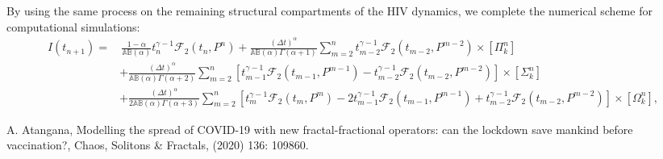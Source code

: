 \documentclass[10pt,a4paper]{amsart}
\numberwithin{equation}{section}
\begin{document}
By using the same process on the remaining structural compartments of the HIV dynamics, we complete the numerical scheme for computational simulations:
\begin{equation}
\begin{aligned}
I(t_{n+1}) = & \, \frac{1-\alpha}{\mathbb{AB}(\alpha)} t_n^{\gamma-1} \mathcal{F}_2(t_n, P^n) + \frac{(\Delta t)^\alpha}{\mathbb{AB}(\alpha)\Gamma(\alpha+1)} \sum_{m=2}^{n} t_{m-2}^{\gamma-1} \mathcal{F}_2(t_{m-2}, P^{m-2}) \times \left[ \Pi_k^n \right] \\
& + \frac{(\Delta t)^\alpha}{\mathbb{AB}(\alpha)\Gamma(\alpha+2)} \sum_{m=2}^{n} \left[ t_{m-1}^{\gamma-1} \mathcal{F}_2(t_{m-1}, P^{m-1}) - t_{m-2}^{\gamma-1} \mathcal{F}_2(t_{m-2}, P^{m-2}) \right] \times \left[ \Sigma_k^n \right] \\
& + \frac{(\Delta t)^\alpha}{2\mathbb{AB}(\alpha)\Gamma(\alpha+3)} \sum_{m=2}^{n} \left[ t_m^{\gamma-1} \mathcal{F}_2(t_m, P^m) - 2t_{m-1}^{\gamma-1} \mathcal{F}_2(t_{m-1}, P^{m-1}) + t_{m-2}^{\gamma-1} \mathcal{F}_2(t_{m-2}, P^{m-2}) \right] \times \left[ \Omega_k^n \right],
\end{aligned}
\end{equation}

\begin{thebibliography}{99}
 A. Atangana, Modelling the spread of COVID-19 with new fractal-fractional operators: can the lockdown save mankind before vaccination?, Chaos, Solitons \& Fractals, (2020) 136: 109860.
\end{thebibliography}
\end{document}
